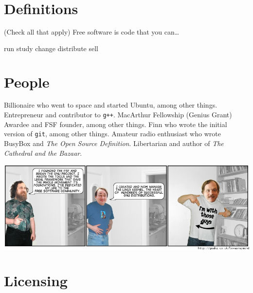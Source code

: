 \documentclass[addpoints,answers]{exam}
\begin{document}
\begin{questions}

\section{Definitions}

\question (Check all that apply) Free software is code that you can\ldots

\begin{oneparcheckboxes}
\choice run
\choice study
\choice change
\choice distribute
\choice sell
\end{oneparcheckboxes}

\section{People}

\question Billionaire who went to space and started Ubuntu, among other things. \answerline[D]
\question Entrepreneur and contributor to \verb$g++$. \answerline[E]
\question MacArthur Fellowship (Genius Grant) Awardee and FSF founder, among other things. \answerline[F]
\question Finn who wrote the initial version of \verb$git$, among other things. \answerline[C]
\question Amateur radio enthusiast who wrote BusyBox and \emph{The Open Source Definition}. \answerline[A]
\question Libertarian and author of \emph{The Cathedral and the Bazaar}. \answerline[B]
\pagebreak

\includegraphics[width=5.5in]{people.jpg}

\section{Licensing}


\end{questions}
\end{document}
